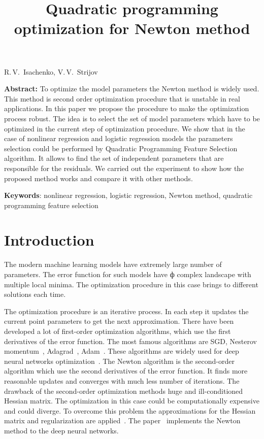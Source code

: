 \documentclass[a4paper,12pt]{article}
\theoremstyle{plain} %
\theoremstyle{definition} %
\theoremstyle{remark} %
\begin{document}
		
		\title
	{Quadratic programming optimization for Newton method}
	\date{}
	\maketitle
	\begin{center}
		R.\,V.~Isachenko,
		V.\,V.~Strijov
	\end{center}
	\textbf{Abstract:} 
	To optimize the model parameters the Newton method is widely used. 
	This method is second order optimization procedure that is unstable in real applications. 
	In this paper we propose the procedure to make the optimization process robust. 
	The idea is to select the set of model parameters which have to be optimized in the current step of optimization procedure.
	We show that in the case of nonlinear regression and logistic regression models the parameters selection could be performed by Quadratic Programming Feature Selection algorithm.
	It allows to find the set of independent parameters that are responsible for the residuals.
	We carried out the experiment to show how the proposed method works and compare it with other methods.
	
	\bigskip
	\textbf{Keywords}: nonlinear regression, logistic regression, Newton method, quadratic programming feature selection
	
	\section*{Introduction}
	The modern machine learning models have extremely large number of parameters. 
	The error function for such models have ф complex landscape with multiple local minima. 
	The optimization procedure in this case brings to different solutions each time.
	
	The optimization procedure is an iterative process. 
	In each step it updates the current point parameters to get the next approximation.
	There have been developed a lot of first-order optimization algorithms, which use the first derivatives of the error function. 
	The most famous algorithms are SGD, Nesterov momentum~\cite{nesterov1983momentum}, Adagrad~\cite{duchi2011adagrad}, Adam~\cite{kingma2014adam}. 
	These algorithms are widely used for deep neural networks optimization~\cite{goodfellow2016deeplearningbook}. 
	The Newton algorithm is the second-order algorithm which use the second derivatives of the error function. 
	It finds more reasonable updates and converges with much less number of iterations.
	The drawback of the second-order optimization methods huge and ill-conditioned Hessian matrix. 
	The optimization in this case could be computationally expensive and could diverge. 
	To overcome this problem the approximations for the Hessian matrix and regularization are applied~\cite{avriel2003nonlinear,blaschke1997convergence}.
	The paper~\cite{botev2017newtondeeplearning} implements the Newton method to the deep neural networks.
	
\end{document}
